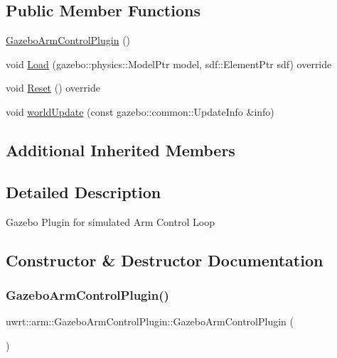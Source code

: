\subsection*{Public Member Functions}
\begin{DoxyCompactItemize}
\item 
\hyperlink{classuwrt_1_1arm_1_1_gazebo_arm_control_plugin_a0d74230d845e14e47d10d11636a76240}{Gazebo\+Arm\+Control\+Plugin} ()
\item 
void \hyperlink{classuwrt_1_1arm_1_1_gazebo_arm_control_plugin_a180f7cf53ddfa6d3a3afbbedc2c88bc7}{Load} (gazebo\+::physics\+::\+Model\+Ptr model, sdf\+::\+Element\+Ptr sdf) override
\item 
void \hyperlink{classuwrt_1_1arm_1_1_gazebo_arm_control_plugin_ae6f4223a75905adedd205b3f594d70d3}{Reset} () override
\item 
void \hyperlink{classuwrt_1_1arm_1_1_gazebo_arm_control_plugin_a83d2d6fb09930c43ee2bb5ab636501b1}{world\+Update} (const gazebo\+::common\+::\+Update\+Info \&info)
\end{DoxyCompactItemize}
\subsection*{Additional Inherited Members}


\subsection{Detailed Description}
Gazebo Plugin for simulated Arm Control Loop 

\subsection{Constructor \& Destructor Documentation}
\mbox{\label{classuwrt_1_1arm_1_1_gazebo_arm_control_plugin_a0d74230d845e14e47d10d11636a76240}} 
\subsubsection{\texorpdfstring{Gazebo\+Arm\+Control\+Plugin()}{GazeboArmControlPlugin()}}
{\footnotesize\ttfamily uwrt\+::arm\+::\+Gazebo\+Arm\+Control\+Plugin\+::\+Gazebo\+Arm\+Control\+Plugin (\begin{DoxyParamCaption}{ }\end{DoxyParamCaption})}




